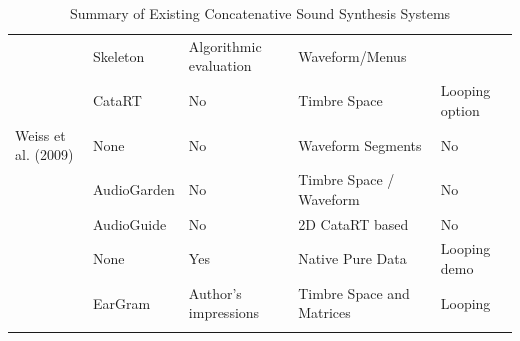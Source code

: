 \begin{table}
\begin{threeparttable}
\begin{centering}
\begin{tabular}{l l l l l}
				\cite{Jehan2005}                  & Skeleton                      & Algorithmic evaluation & Waveform/Menus               &                \\
				\cite{Schwarz2006}                & CataRT                        & No                     & Timbre Space              & Looping option \\
			    Weiss et al. (2009)           & None                          & No                     & Waveform Segments            & No             \\
				\cite{Frisson2010}         & AudioGarden                   & No                     & Timbre Space / Waveform   & No             \\
				\cite{Hackbarth2010}			& AudioGuide                    & No                     & 2D CataRT based              & No             \\
				\cite{OConnell2011}             & None                          & Yes                    & Native Pure Data             & Looping demo   \\
				\cite{Bernardes2013}            & EarGram                       & Author's impressions   & Timbre Space and Matrices & Looping			\\	
				\tablebot		
			\end{tabular}
			\par \end{centering}		
		\begin{tablenotes}
			\small
		\end{tablenotes}
			\caption[Summary of Existing Concatenative Sound Synthesis Systems]{Summary of Existing Concatenative Sound Synthesis Systems}
			\label{tab:concat_system_summary}
	\end{threeparttable}
\end{table}

 